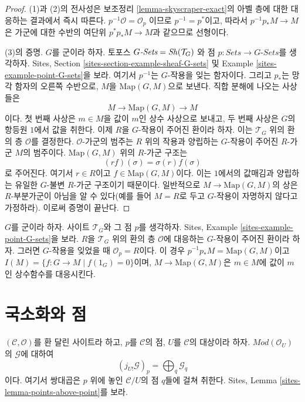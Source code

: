 \begin{proof}
(1)과 (2)의 전사성은 보조정리 \ref{lemma-skyscraper-exact}의 아벨 층에
대한 대응하는 결과에서 즉시 따른다. $p^{-1}\mathcal{O} = \mathcal{O}_p$
이므로 $p^{-1} = p^*$이고, 따라서 $p^{-1}p_*M \to M$은 가군에 대한
수반의 여단위 $p^*p_*M \to M$과 같으므로 선형이다.

\medskip\noindent
(3)의 증명. $G$를 군이라 하자. 토포스
$G\textit{-Sets} = \mathop{\mathit{Sh}}\nolimits(\mathcal{T}_G)$
와 점 $p : \textit{Sets} \to G\textit{-Sets}$를 생각하자. Sites, Section
\ref{sites-section-example-sheaf-G-sets} 및 Example
\ref{sites-example-point-G-sets}을 보라. 여기서 $p^{-1}$는 $G$-작용을
잊는 함자이다. 그리고 $p_*$는 망각 함자의 오른쪽 수반으로,
$M$을 $\text{Map}(G, M)$으로 보낸다. 직합 분해에 나오는 사상들은
$$
M \to \text{Map}(G, M) \to M
$$
이다. 첫 번째 사상은 $m \in M$을 값이 $m$인 상수 사상으로 보내고,
두 번째 사상은 $G$의 항등원 $1$에서 값을 취한다. 이제 $R$을
$G$-작용이 주어진 환이라 하자. 이는 $\mathcal{T}_G$ 위의 환의 층
$\mathcal{O}$를 결정한다. $\mathcal{O}$-가군의 범주는 $R$ 위의 작용과
양립하는 $G$-작용이 주어진 $R$-가군 $M$의 범주이다.
$\text{Map}(G, M)$ 위의 $R$-가군 구조는
$$
( r f ) (\sigma) = \sigma(r) f(\sigma)
$$
로 주어진다. 여기서 $r \in R$이고 $f \in \text{Map}(G, M)$이다.
이는 $1$에서의 값매김과 양립하는 유일한 $G$-불변 $R$-가군 구조이기
때문이다. 일반적으로 $M \to \text{Map}(G, M)$의 상은 $R$-부분가군이
아님을 알 수 있다(예를 들어 $M = R$로 두고 $G$-작용이 자명하지 않다고
가정하라). 이로써 증명이 끝난다.
\end{proof}

\begin{example}
\label{example-ring-with-group-action}
$G$를 군이라 하자. 사이트 $\mathcal{T}_G$와 그 점 $p$를 생각하자.
Sites, Example \ref{sites-example-point-G-sets}을 보라. $R$을
$\mathcal{T}_G$ 위의 환의 층 $\mathcal{O}$에 대응하는 $G$-작용이 주어진
환이라 하자. 그러면 $G$-작용을 잊었을 때 $\mathcal{O}_p = R$이다.
이 경우 $p^{-1}p_*M = \text{Map}(G, M)$이고
$I(M) = \{f : G \to M \mid f(1_G) = 0\}$이며,
$M \to \text{Map}(G, M)$은 $m \in M$에 값이 $m$인 상수함수를 대응시킨다.
\end{example}




\section{국소화와 점}
\label{section-localize-points}

\begin{lemma}
\label{lemma-stalk-j-shriek}
$(\mathcal{C}, \mathcal{O})$를 환 달린 사이트라 하고, $p$를
$\mathcal{C}$의 점, $U$를 $\mathcal{C}$의 대상이라 하자.
$\textit{Mod}(\mathcal{O}_U)$의 $\mathcal{G}$에 대하여
$$
(j_{U!}\mathcal{G})_p =
\bigoplus\nolimits_q \mathcal{G}_q
$$
이다. 여기서 쌍대곱은 $p$ 위에 놓인 $\mathcal{C}/U$의 점 $q$들에
걸쳐 취한다. Sites, Lemma \ref{sites-lemma-points-above-point}를 보라.
\end{lemma}

